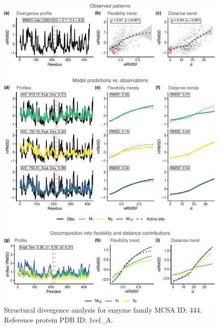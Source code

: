 \documentclass[
]{article}
\begin{document}
\clearpage
\begin{figure}[H]
\centering


\begin{center}\includegraphics{supplementary_material_files/figure-latex/generate_figures-21} \end{center}

\caption{Structural divergence analysis for enzyme family MCSA ID: 444. Reference protein PDB ID: 1cel\_A.}
\end{figure}
\end{document}
